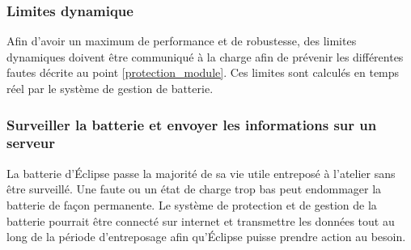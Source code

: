 	\subsubsection{Limites dynamique}
	Afin d'avoir un maximum de performance et de robustesse, des limites dynamiques doivent être communiqué à la charge afin de prévenir les différentes fautes décrite au point \ref{protection_module}. Ces limites sont calculés en temps réel par le système de gestion de batterie.
	
	\subsubsection{Surveiller la batterie et envoyer les informations sur un serveur}
	La batterie d'Éclipse passe la majorité de sa vie utile entreposé à l'atelier sans être surveillé. Une faute ou un état de charge trop bas peut endommager la batterie de façon permanente. Le système de protection et de gestion de la batterie pourrait être connecté sur internet et transmettre les données tout au long de la période d'entreposage afin qu'Éclipse puisse prendre action au besoin.  
